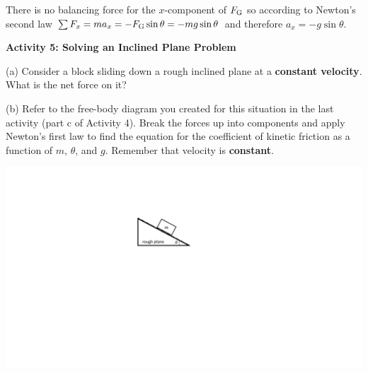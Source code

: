 There is no balancing force for the $x$-component of $F_{\rm G}$ so according to Newton's
second law \( \sum F_{x}  = ma_{x} = -F_{\rm G} \sin \theta
= - mg \sin \theta  \) and therefore \( a_{x} = - g \sin \theta  \).

\textbf{Activity 5: Solving an Inclined Plane Problem} 

(a) Consider a block sliding down a rough inclined plane at a \textbf{constant velocity}. What is the net force on it?
\vspace{20mm}

(b) Refer to the free-body diagram you created for this situation in the last
activity (part c of Activity 4). Break the forces up into components and apply Newton's first law to
find the equation for the coefficient of kinetic friction as a function of $m$,
\( \theta  \), and $g$. Remember that velocity is \textbf{constant}.

\vspace{0.3cm}
{\par\centering \includegraphics{friction/rough_plane.pdf} \par}
\vspace{0.3cm}

